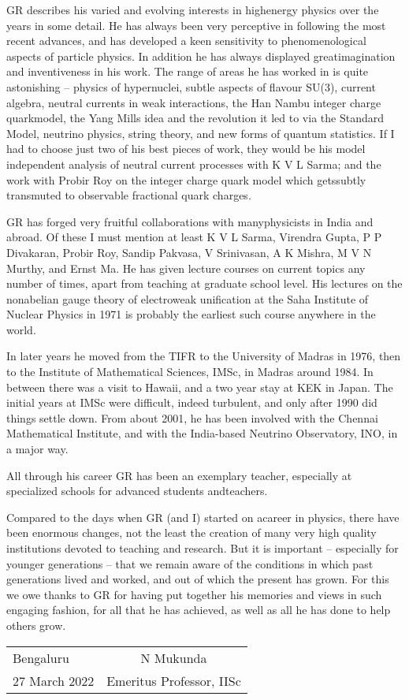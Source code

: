 GR describes his varied and evolving interests in high\break energy physics 
over the years in some detail. He has always been very perceptive in 
following the most recent advances, and has developed a keen 
sensitivity to phenomenological aspects of particle physics. In 
addition he has always displayed great\break imagination and inventiveness in 
his work. The range of areas\- he has worked in is quite astonishing – 
physics of hypernuclei, subtle aspects of flavour SU(3), current 
algebra, neutral currents in weak interactions, the Han Nambu integer 
charge quark\break model, the Yang Mills idea and the revolution it led to 
via the Standard Model, neutrino physics, string theory, and new forms 
of quantum statistics. If I had to choose just two of his best pieces 
of work, they would be his model independent analysis of neutral 
current processes with K V L Sarma; and the work with Probir Roy on 
the integer charge quark model which gets\break subtly transmuted to 
observable fractional quark charges.


GR has forged very fruitful collaborations with many\break physicists in 
India and abroad. Of these I must mention at least K V L Sarma, 
Virendra Gupta, P P Divakaran, Probir Roy, Sandip Pakvasa, V 
Srinivasan, A K Mishra, M V N Murthy, and Ernst Ma. He has given 
lecture courses on current topics any number of times, apart from 
teaching at graduate school level. His lectures on the nonabelian gauge 
theory of electroweak unification at the Saha Institute of Nuclear 
Physics in 1971 is probably the earliest such course anywhere in the 
world.


In later years he moved from the TIFR to the University of Madras in 
1976, then to the Institute of Mathematical Sciences, IMSc, in Madras 
around 1984. In between there was a visit to Hawaii, and a two year 
stay at KEK in Japan. The initial years at IMSc were difficult, indeed 
turbulent, and only after 1990 did things settle down. From about 2001, 
he has been involved with the Chennai Mathematical Institute, and with 
the India-based Neutrino Observatory, INO, in a major way.


All through his career GR has been an exemplary teacher, especia\-lly at 
specialized schools for advanced students and\break teachers.  


Compared to the days when GR (and I) started on a\break career in physics, 
there have been enormous changes, not the least the crea\-tion of many 
very high quality institutions devoted to teaching and research. But it 
is important – especially for younger generations – that we remain 
aware of the conditions in which past generations lived and worked, 
and out of which the present has grown. For this we owe thanks to GR 
for having put together his memories and views in such engaging fashion, 
for all that he has achieved, as well as all he has done to help 
others grow.
\vskip 1cm

\begin{flushleft}
\begin{tabular}{l@{\phantom{WWWWWWWWW}}c}
Bengaluru & \quad N Mukunda\\
27 March 2022 & Emeritus Professor, IISc
\end{tabular}
\end{flushleft}

